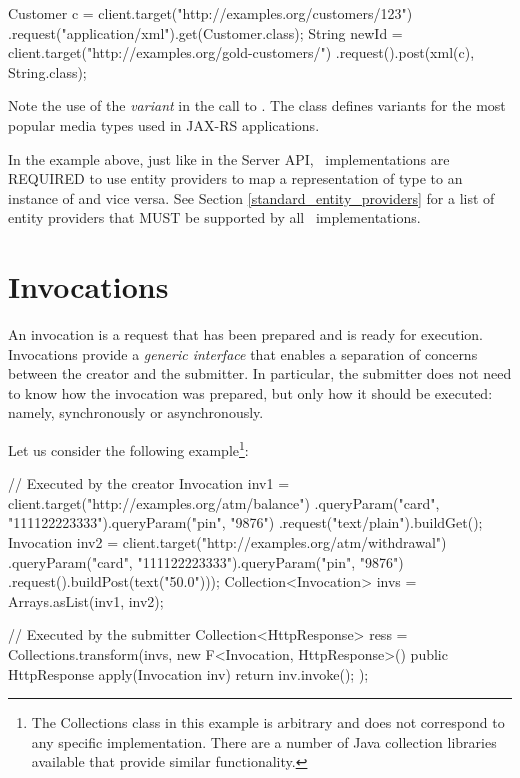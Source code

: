 \begin{listing}{1}
Customer c = client.target("http://examples.org/customers/123")
    .request("application/xml").get(Customer.class);
String newId = client.target("http://examples.org/gold-customers/")
    .request().post(xml(c), String.class);
\end{listing}

Note the use of the {\em variant}  in the call to . The class  defines variants for the most popular media types used in JAX-RS applications.

In the example above, just like in the Server API, \jaxrs\ implementations are REQUIRED to use entity providers to map a representation of type  to an instance of  and vice versa. See Section \ref{standard_entity_providers} for a list of entity providers that MUST be supported by all \jaxrs\ implementations.

\section{Invocations}
\label{invocations}

An invocation is a request that has been prepared and is ready for execution. Invocations provide a {\em generic interface} that enables a separation of concerns between the creator and the submitter. In particular, the submitter does not need to know how the invocation was prepared, but only how it should be executed: namely, synchronously or asynchronously.

 Let us consider the following example\footnote{The Collections class in this example is arbitrary and does not correspond to any specific implementation. There are a number of Java collection libraries available that provide similar functionality.}:

\begin{listing}{1}
// Executed by the creator
Invocation inv1 = client.target("http://examples.org/atm/balance")
    .queryParam("card", "111122223333").queryParam("pin", "9876")
    .request("text/plain").buildGet();
Invocation inv2 = client.target("http://examples.org/atm/withdrawal")
    .queryParam("card", "111122223333").queryParam("pin", "9876")
    .request().buildPost(text("50.0")));
Collection<Invocation> invs = Arrays.asList(inv1, inv2);

// Executed by the submitter
Collection<HttpResponse> ress =
    Collections.transform(invs,
        new F<Invocation, HttpResponse>() {
             public HttpResponse apply(Invocation inv) {
                 return inv.invoke(); } });
\end{listing}

